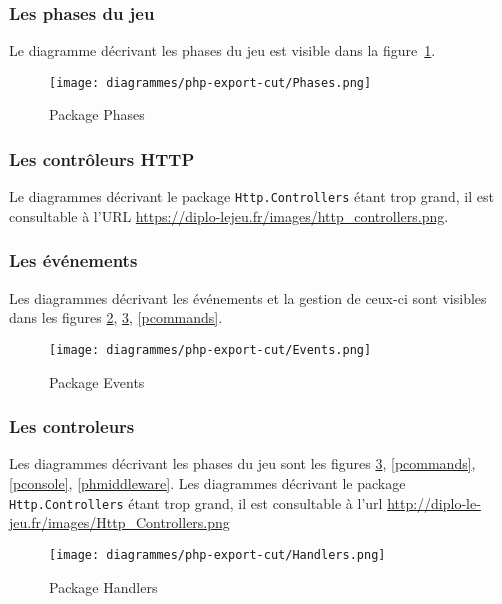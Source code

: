         \subsubsection{Les phases du jeu}
        Le diagramme décrivant les phases du jeu est visible dans la figure~\ref{pphases}.

			\begin{figure}[H]
				\centering
                \texttt{[image: diagrammes/php-export-cut/Phases.png]}
                \caption{\label{pphases}Package Phases}
			\end{figure}

        \subsubsection{Les contrôleurs HTTP}
        Le diagrammes décrivant le package \verb|Http.Controllers| étant trop grand, il est consultable à l'URL \url{https://diplo-lejeu.fr/images/http\_controllers.png}.

        \subsubsection{Les événements}
        Les diagrammes décrivant les événements et la gestion de ceux-ci sont visibles dans les figures \ref{pevents}, \ref{phandlers}, \ref{pcommands}.

        	\begin{figure}[H]
				\centering
                \texttt{[image: diagrammes/php-export-cut/Events.png]}
                \caption{\label{pevents}Package Events}
			\end{figure}
        
        \newpage
        \subsubsection{Les controleurs}
        Les diagrammes décrivant les phases du jeu sont les figures \ref{phandlers}, \ref{pcommands}, \ref{pconsole}, \ref{phmiddleware}.
        Les diagrammes décrivant le package \verb|Http.Controllers| étant trop
        grand, il est consultable à l'url \url{http://diplo-le-jeu.fr/images/Http\_Controllers.png}

			\begin{figure}[H]
				\centering
                \texttt{[image: diagrammes/php-export-cut/Handlers.png]}
                \caption{\label{phandlers}Package Handlers}
			\end{figure}

